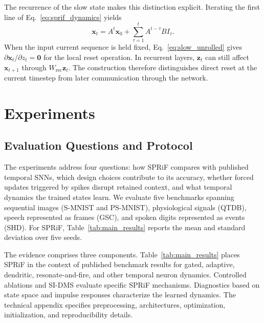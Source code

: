 \documentclass[letterpaper]{article} %
\begin{document}
The recurrence of the slow state makes this distinction explicit. Iterating the first line of Eq.~\eqref{eq:sprif_dynamics} yields
\begin{equation}
\mathbf{x}_t=A^t\mathbf{x}_0+\sum_{\tau=1}^{t}A^{t-\tau}B I_\tau.
\label{eq:slow_unrolled}
\end{equation}
When the input current sequence is held fixed, Eq.~\eqref{eq:slow_unrolled} gives $\partial\mathbf{x}_t/\partial z_t=\mathbf{0}$ for the local reset operation. In recurrent layers, $\mathbf{z}_t$ can still affect $\mathbf{x}_{t+1}$ through $W_{\mathrm{rec}}\mathbf{z}_t$. The construction therefore distinguishes direct reset at the current timestep from later communication through the network.


\section{Experiments}

\subsection{Evaluation Questions and Protocol}

The experiments address four questions: how SPRiF compares with published temporal SNNs, which design choices contribute to its accuracy, whether forced updates triggered by spikes disrupt retained context, and what temporal dynamics the trained states learn. We evaluate five benchmarks spanning sequential images (S-MNIST and PS-MNIST), physiological signals (QTDB), speech represented as frames (GSC), and spoken digits represented as events (SHD). For SPRiF, Table~\ref{tab:main_results} reports the mean and standard deviation over five seeds.

The evidence comprises three components. Table~\ref{tab:main_results} places SPRiF in the context of published benchmark results for gated, adaptive, dendritic, resonate-and-fire, and other temporal neuron dynamics. Controlled ablations and SI-DMS evaluate specific SPRiF mechanisms. Diagnostics based on state space and impulse responses characterize the learned dynamics. The technical appendix specifies preprocessing, architectures, optimization, initialization, and reproducibility details.
\end{document}
